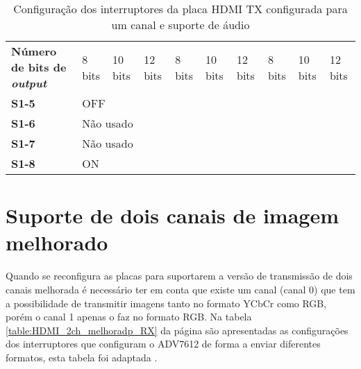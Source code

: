 \begin{table}[h!]
{\begin{tabular}{@{}llllllllll@{}}
			\multicolumn{1}{l|}{\textbf{Número de bits de \textit{output}}} & 8 bits & 10 bits & 12 bits & 8 bits & 10 bits & 12 bits & 8 bits & 10 bits & 12 bits \\
			\multicolumn{1}{l|}{\textbf{S1-5}} & \multicolumn{9}{l}{OFF} \\
			\multicolumn{1}{l|}{\textbf{S1-6}} & \multicolumn{9}{l}{Não usado} \\
			\multicolumn{1}{l|}{\textbf{S1-7}} & \multicolumn{9}{l}{Não usado} \\
			\multicolumn{1}{l|}{\textbf{S1-8}} & \multicolumn{9}{l}{ON} \\ \bottomrule
		\end{tabular}%
	}
	
	\caption{Configuração dos interruptores da placa HDMI TX configurada para um canal e suporte de áudio}
	\label{table:HDMI_1ch+audio_switches_TX}
\end{table}

\section{Suporte de dois canais de imagem melhorado} \label{sec:HDMIconfigMelhorado_switches}

Quando se reconfigura as placas para suportarem a versão de transmissão de dois canais melhorada é necessário ter em conta que existe um canal (canal 0) que tem a possibilidade de transmitir imagens tanto no formato YCbCr como RGB, porém o canal 1 apenas o faz no formato RGB. Na tabela \ref{table:HDMI_2ch_melhoradp_RX} da página \pageref{table:HDMI_2ch_melhoradp_RX} são apresentadas as configurações dos interruptores que configuram o ADV7612 de forma a enviar diferentes formatos, esta tabela foi adaptada \cite{R013}.


